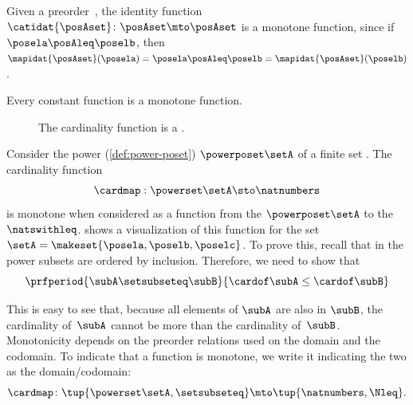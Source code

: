 \begin{example}
    Given a preorder~\posA, the identity function~$\catidat{\posAset}\colon \posAset \mto\linebreak[0] \posAset$ is a monotone function, since if~$\posela\posAleq \poselb$, then~$\mapidat{\posAset}(\posela)=\posela \posAleq \poselb = \mapidat{\posAset}(\poselb )$.
\end{example}

\begin{example}
    Every constant function is a monotone function.
\end{example}

\begin{figure}[b]
    \centering
    \caption{The cardinality function is a .}
    \label{fig:cardinality}
\end{figure}

\begin{example}\label{exa:cardinality}
    Consider the power  (\cref{def:power-poset}) $\powerposet\setA$ of a finite set \setA.
    The cardinality function
    \begin{equation}\label{eq:cardinality-map}
        \cardmap : \powerset\setA \sto \natnumbers
    \end{equation}
    is monotone when considered as a function from the  $\powerposet\setA$ to the  $\natswithleq$.
     shows a visualization of this function for the set~$\setA=\makeset{\posela,\poselb,\poselc}$.
    To prove this, recall that in the power  subsets are ordered by inclusion.
    Therefore, we need to show that
    \begin{equation}\label{eq:cardinality}
        \prfperiod{
            \subA \setsubseteq \subB
        }{
            \cardof \subA \leq \cardof \subB
        }
    \end{equation}

    This is easy to see that, because all elements of $\subA$ are also in $\subB$, the cardinality of~$\subA$ cannot be more than the cardinality of~$\subB$.
    Monotonicity depends on the preorder relations used on the domain and the codomain.
    To indicate that a function is monotone, we write it indicating the two  as the domain/codomain:
    \begin{equation}\label{eq:cardinality-as-posmap}
        \cardmap \colon \tup{\powerset\setA, \setsubseteq} \mto \tup{\natnumbers, {{\Nleq}}}.
    \end{equation}
\end{example}

